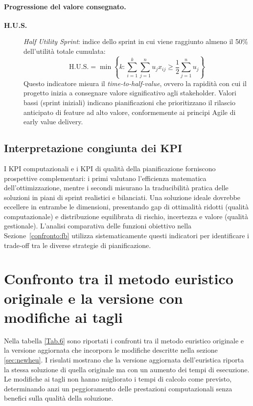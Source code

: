 \documentclass[12pt,a4paper,openright,twoside]{book}
\begin{document}
\paragraph{Progressione del valore consegnato.}

\begin{description}
    \item[\textbf{H.U.S.}] \emph{Half Utility Sprint}: indice dello sprint in cui viene raggiunto almeno il 50\% dell'utilità totale cumulata:
    \[
    \text{H.U.S.} = \min \left\{ k : \sum_{i=1}^{k} \sum_{j=1}^{n} u_j x_{ij} \geq \frac{1}{2} \sum_{j=1}^{n} u_j \right\}
    \]
    Questo indicatore misura il \emph{time-to-half-value}, ovvero la rapidità con cui il progetto inizia a consegnare valore significativo agli stakeholder. Valori bassi (sprint iniziali) indicano pianificazioni che prioritizzano il rilascio anticipato di feature ad alto valore, conformemente ai principi Agile di early value delivery.
\end{description}

\subsection{Interpretazione congiunta dei KPI}

I KPI computazionali e i KPI di qualità della pianificazione forniscono prospettive complementari: i primi valutano l'efficienza matematica dell'ottimizzazione, mentre i secondi misurano la traducibilità pratica delle soluzioni in piani di sprint realistici e bilanciati. Una soluzione ideale dovrebbe eccellere in entrambe le dimensioni, presentando gap di ottimalità ridotti (qualità computazionale) e distribuzione equilibrata di rischio, incertezza e valore (qualità gestionale). L'analisi comparativa delle funzioni obiettivo nella Sezione~\ref{confronto:fb} utilizza sistematicamente questi indicatori per identificare i trade-off tra le diverse strategie di pianificazione.

 
\section{Confronto tra il metodo euristico originale e la versione con modifiche ai tagli}

Nella tabella \ref{Tab.6} sono riportati i confronti tra il metodo euristico originale e la versione aggiornata che incorpora le modifiche descritte nella sezione \ref{sec:newheu}. I risulati mostrano che la versione aggiornata dell'euristica riporta la stessa soluzione di quella originale ma con un aumento dei tempi di esecuzione.
Le modifiche ai tagli non hanno migliorato i tempi di calcolo come previsto, determinando anzi un peggioramento delle prestazioni computazionali senza benefici sulla qualità della soluzione.
\end{document}
